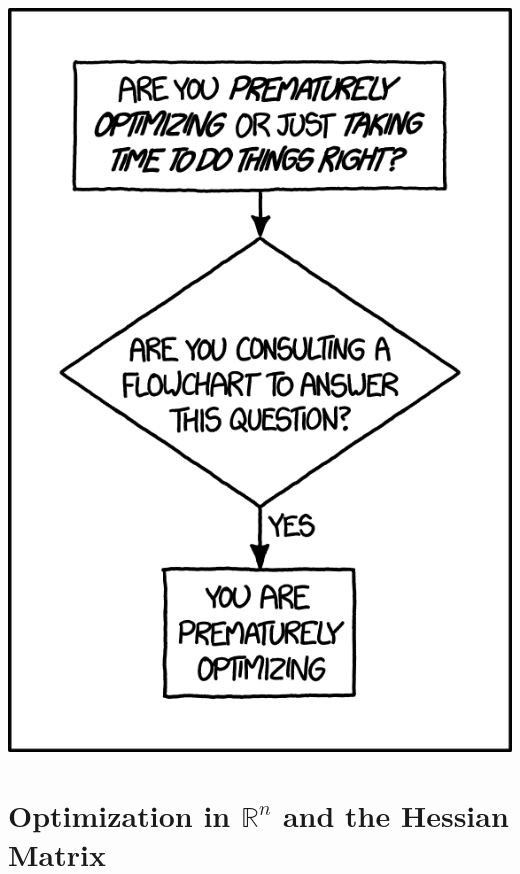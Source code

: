 \documentclass[oneside]{book}
\begin{document}
\begin{savequote}
    \includegraphics[scale=0.4]{Graphics/optimization.png}
\end{savequote}
    \chapter{Optimization in \(\mathbb{R}^n\) and the Hessian Matrix} \label{appendix:c}
    
        
\end{document}
